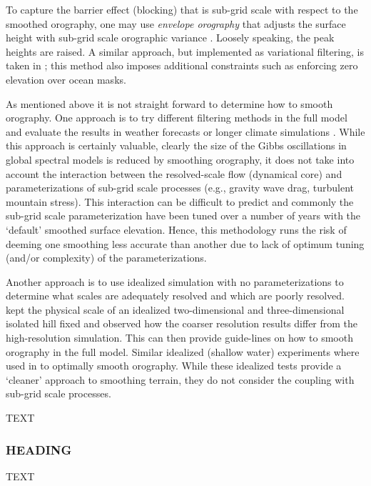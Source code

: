 \documentclass[gmd]{copernicus}
\begin{document}
To capture the barrier effect (blocking) that is sub-grid scale with respect to the smoothed orography, one may use {\em{envelope orography}} that adjusts the surface height with sub-grid scale orographic variance \citep{WTS1983QJRMS}. Loosely speaking, the peak heights are raised. A similar approach, but implemented as variational filtering, is taken in \cite{RTS2006QJRMS}; this method also imposes additional constraints such as enforcing zero elevation over ocean masks.

 
As mentioned above it is not straight forward to determine how to smooth orography. One approach is to try different filtering methods in the full model and evaluate the results in weather forecasts or longer climate simulations \citep{NSM1994JC,B1995QJRMS,H1996JC}. While this approach is certainly valuable, clearly the size of the Gibbs oscillations in global spectral models is reduced by smoothing orography, it does not take into account the interaction between the resolved-scale flow (dynamical core) and parameterizations of sub-grid scale processes (e.g., gravity wave drag, turbulent mountain stress). This interaction can be difficult to predict and commonly the sub-grid scale parameterization have been tuned over a number of years with the `default' smoothed surface elevation. Hence, this methodology runs the risk of deeming one smoothing less accurate than another due to lack of optimum tuning (and/or complexity) of the parameterizations.

Another approach is to use idealized simulation with no parameterizations to determine what scales are adequately resolved and which are poorly resolved. \cite{DB2001QJRMS} kept the physical scale of an idealized two-dimensional and three-dimensional isolated hill fixed and observed how the coarser resolution results differ from the high-resolution simulation. This can then provide guide-lines on how to smooth orography in the full model. Similar idealized (shallow water) experiments where used in \cite{RTS2006QJRMS} to optimally smooth orography. While these idealized tests provide a `cleaner' approach to smoothing terrain, they do not consider the coupling with sub-grid scale processes.







TEXT

\subsubsection{HEADING}
TEXT
\end{document}
